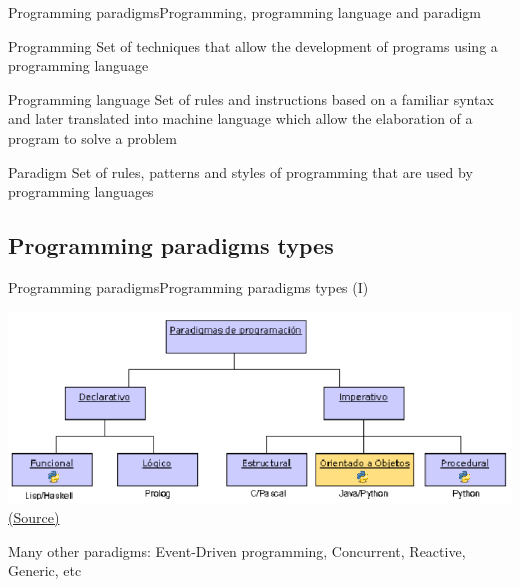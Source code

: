 \documentclass[10pt,compress]{beamer} %
\begin{document}
\begin{frame}{Programming paradigms}{Programming, programming language and paradigm}
	\begin{block}{Programming}
		Set of techniques that allow the development of programs using a programming language
	\end{block}
	\begin{block}{Programming language}
		Set of rules and instructions based on a familiar syntax and later translated into machine language which allow the elaboration of a program to solve a problem	\end{block}
	\begin{block}{Paradigm}
		Set of rules, patterns and styles of programming that are used by programming languages
	\end{block}

\end{frame}

\subsection[Programming paradigms types]{Programming paradigms types}

\begin{frame}{Programming paradigms}{Programming paradigms types (I)}
	\begin{center}
	\includegraphics[scale=0.4]{figs/paradigmas}\\
	\tiny{\href{http://www.computer.org/csdl/mags/it/2011/05/mit2011050030-abs.html}{(Source)}}\\
	\end{center}
	\normalsize{Many other paradigms: Event-Driven programming, Concurrent, Reactive, Generic, etc}
\end{frame}
\end{document}

